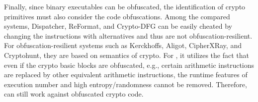 Finally, since binary executables can be obfuscated, the identification of crypto primitives must also consider the code obfuscations. Among the compared systems,  \textsf{\small Dispatcher},  \textsf{\small ReFormat}, and \textsf{\small Crypto-DFG} can be easily cheated by changing the instructions with alternatives and thus are not obfuscation-resilient. 
For obfuscation-resilient systems such as \textsf{\small Kerckhoffs}, \textsf{\small Aligot}, \textsf{\small CipherXRay}, and \textsf{\small Cryptohunt}, they are based on semantics of crypto. For \sysname, it utilizes the fact that even if the crypto basic blocks are obfuscated, e.g., certain arithmetic instructions are replaced by other equivalent arithmetic instructions, %
the runtime features of execution number and high entropy/randomness cannot be removed. Therefore, \sysname can still work against obfuscated crypto code. 




